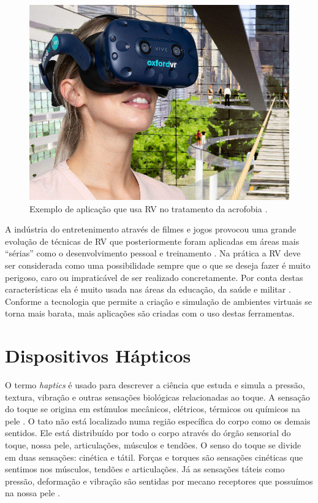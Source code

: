 \begin{figure}[ht!]
    \centering
    \includegraphics[width=0.6\linewidth]{capitulos/figuras/fear_of_heights.jpg}
    \caption{Exemplo de aplicação que usa \acrshort{RV} no tratamento da acrofobia \cite{Edwards2018}.}
    \label{fig:medoAltura}
\end{figure}

A indústria do entretenimento através de filmes e jogos provocou uma grande evolução de técnicas de \acrshort{RV} que posteriormente foram aplicadas em áreas mais “sérias” como o desenvolvimento pessoal e treinamento \cite{Ma2011, Prensky2001, Smith2011}. Na prática a \acrshort{RV} deve ser considerada como uma possibilidade sempre que o que se deseja fazer é muito perigoso, caro ou impraticável de ser realizado concretamente. Por conta destas características ela é muito usada nas áreas da educação, da saúde e militar \cite{VRS2018}. Conforme a tecnologia que permite a criação e simulação de ambientes virtuais se torna mais barata, mais aplicações são criadas com o uso destas ferramentas.

\section{Dispositivos Hápticos}

O termo \textit{haptics} é usado para descrever a ciência que estuda e simula a pressão, textura, vibração e outras sensações biológicas relacionadas ao toque. A sensação do toque se origina em estímulos mecânicos, elétricos, térmicos ou químicos na pele \cite{Burdea1996}. O tato não está localizado numa região específica do corpo como os demais sentidos. Ele está distribuído por todo o corpo através do órgão sensorial do toque, nossa pele, articulações, músculos e tendões. O senso do toque se divide em duas sensações: cinética e tátil. Forças e torques são sensações cinéticas que sentimos nos músculos, tendões e articulações. Já as sensações táteis como pressão, deformação e vibração são sentidas por mecano receptores que possuímos na nossa pele \cite{Culbertson2018}. 

